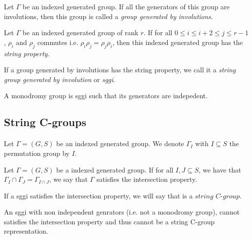 \begin{definition}
  Let $\Gamma$ be an indexed generated group. If all the generators of this group are involutions, then this group is called a \textit{group generated by involutions}.
\end{definition}

\begin{definition}
  Let $\Gamma$ be an indexed generated group of rank $r$. If for all $0 \le i \le i + 2 \le j \le r-1$, $\rho_i$ and $\rho_j$ commutes i.e. $\rho_i \rho_j = \rho_j\rho_i$, then this indexed generated group has the \textit{string property}.
\end{definition}

\begin{definition}
  If a group generated by involutions has the string property, we call it a \textit{string group generated by involution} or \textit{sggi}.
\end{definition}

\begin{definition}
  A monodromy group is sggi such that its generators are indepedent.
\end{definition}

\subsection{String C-groups}

\paragraph{}
Let $\Gamma = (G,S)$ be an indexed generated group. We denote $\Gamma_I$ with $I \subseteq S$ the permutation group by $I$.

\begin{definition}
  Let $\Gamma = (G,S)$ be a indexed generated group. If for all $I, J \subseteq S$, we have that $\Gamma_I \cap \Gamma_J = \Gamma_{I \cap J}$, we say that $\Gamma$ satisfies the intersection property.
\end{definition}

\begin{definition}
  If a sggi satisfies the intersection property, we will say that is a $\textit{string C-group}$.
\end{definition}

\begin{property}
  \label{not-monodromy-intersection}
  An sggi with non independent genrators (i.e. not a monodromy group), cannot satisfies the intersection property and thus cannot be a string C-group representation.
\end{property}
